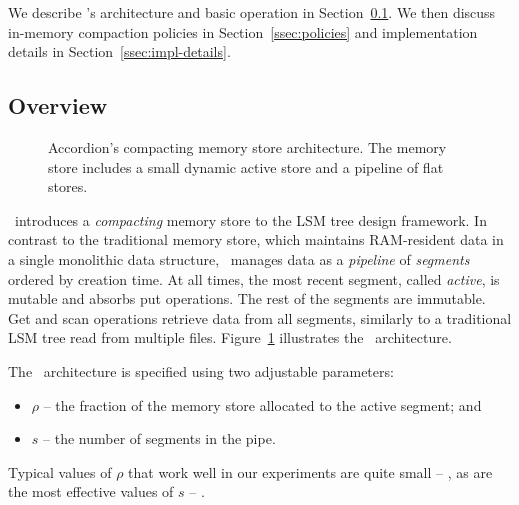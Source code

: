 
We describe  \sys's architecture and basic operation in Section~\ref{ssec:overview}.
We then discuss in-memory compaction policies  in  Section~\ref{ssec:policies}
and implementation details in Section~\ref{ssec:impl-details}. 

\subsection{Overview} \label{ssec:overview}

\begin{figure}[tbh]
\center
\caption{Accordion's compacting memory store architecture. The memory store includes a small dynamic active store and a pipeline of flat stores. }
\label{fig:accordion}
\end{figure}

\sys\ introduces a \emph{compacting} memory store to the LSM tree design framework. In contrast to the traditional memory store, 
which maintains RAM-resident data in a single monolithic data structure, \sys\ manages data as a \emph{pipeline} of 
\emph{segments} ordered by creation time. At all times, the most recent segment, called \emph{active}, is mutable and absorbs 
 put operations. The rest of the segments are immutable. Get and scan operations retrieve data from all  segments, 
 similarly to a traditional LSM tree read from multiple files. Figure~\ref{fig:accordion} illustrates the \sys\ architecture. 

The \sys\ architecture is specified using two adjustable parameters:
\begin{itemize}
\item  $\rho$ -- the fraction of the memory store allocated to the active segment; and 
\item $s$ -- the number of segments in the pipe.
\end{itemize}

Typical values of $\rho$ that work well in our experiments are quite small -- , as are the most effective values
of $s$ -- . 

